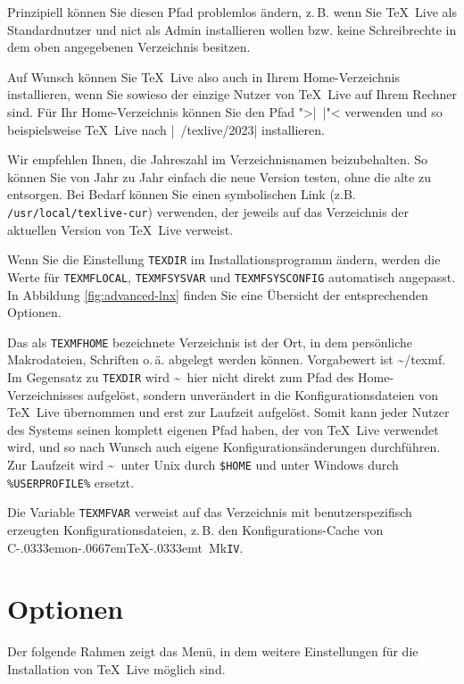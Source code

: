 \documentclass[12pt,ngerman,a4paper,fullparskip]{report}
\newcommand{\TL}{\TeX\ Live\xspace}
\newcommand{\acro}[1]{\texttt{#1}}
\newcommand{\dirname}[1]{\texttt{#1}}
\newcommand\ConTeXt{C\kern-.0333emon\-\kern-.0667em\TeX\kern-.0333emt}
\begin{document}
Prinzipiell können Sie diesen Pfad problemlos ändern, z.\,B. wenn Sie \TL als Standardnutzer und nict als Admin installieren wollen bzw. keine Schreibrechte in dem oben angegebenen Verzeichnis besitzen.

Auf Wunsch können Sie \TL also auch in Ihrem Home-Verzeichnis installieren, wenn Sie sowieso der einzige Nutzer von \TL auf Ihrem Rechner sind. Für Ihr Home-Verzeichnis können Sie den Pfad ">|~|"< verwenden und so beispielsweise \TL nach  |~/texlive/2023| installieren.

Wir empfehlen Ihnen, die Jahreszahl im Verzeichnisnamen beizubehalten. So können Sie von Jahr zu Jahr einfach die neue Version testen, ohne die alte zu entsorgen. Bei Bedarf können Sie einen symbolischen
Link (z.B. \dirname{/usr/local/texlive-cur}) verwenden, der jeweils auf das Verzeichnis der aktuellen Version von \TL verweist.

Wenn Sie die Einstellung \dirname{TEXDIR} im Installationsprogramm ändern, werden die Werte für
\dirname{TEXMFLOCAL}, \dirname{TEXMFSYSVAR} und \dirname{TEXMFSYSCONFIG} automatisch angepasst. In Abbildung \ref{fig:advanced-lnx} finden Sie eine Übersicht der entsprechenden Optionen.

Das als \dirname{TEXMFHOME} bezeichnete Verzeichnis ist der Ort, in dem persönliche Makrodateien,
Schriften o.\,ä. abgelegt werden können. Vorgabewert ist \textasciitilde/texmf. Im Gegensatz zu \dirname{TEXDIR} wird \textasciitilde\ hier nicht direkt zum Pfad des Home-Verzeichnisses aufgelöst, sondern unverändert in die Konfigurationsdateien von \TL übernommen und erst zur Laufzeit aufgelöst. Somit kann jeder Nutzer des Systems seinen komplett eigenen Pfad haben, der von \TL verwendet wird, und so nach Wunsch auch eigene Konfigurationsänderungen durchführen. Zur Laufzeit wird \textasciitilde\ unter Unix durch \dirname{\$HOME} und unter Windows durch \verb|%USERPROFILE%| ersetzt.

Die Variable \dirname{TEXMFVAR} verweist auf das Verzeichnis mit benutzerspezifisch
erzeugten Konfigurationsdateien, z.\,B. den Konfigurations-Cache von \ConTeXt\ Mk\acro{IV}.

\clearpage

\section{Optionen}\label{sec:options}

Der folgende Rahmen zeigt das Menü, in dem weitere Einstellungen für die Installation von \TL möglich sind.
\end{document}
